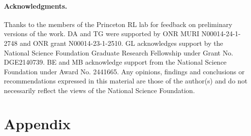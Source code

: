 \documentclass{article}
\begin{document}
\paragraph{Acknowledgments.}
Thanks to the members of the Princeton RL lab for feedback on preliminary versions of the work.
DA and TG were supported by ONR MURI N00014-24-1-2748 and ONR grant N00014-23-1-2510.
GL acknowledges support by the National Science Foundation Graduate Research Fellowship under Grant No. DGE2140739.
BE and MB acknowledge support from the National Science Foundation under Award No. 2441665. Any opinions, findings and conclusions or recommendations expressed in this material are those of the author(s) and do not necessarily reflect the views of the National Science Foundation.

% 
% 



\appendix
\clearpage
\onecolumn            %
\section*{Appendix}
\end{document}
